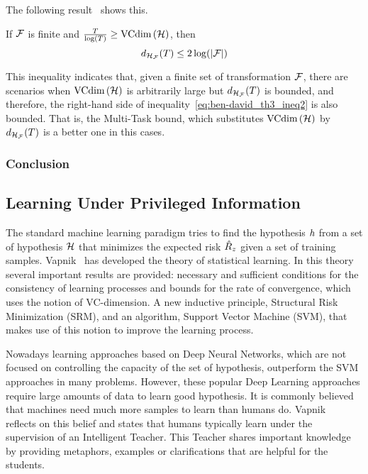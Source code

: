 The following result~\cite[Theorem~6]{Ben-DavidB08} shows this.
\begin{theorem}\label{th:ben-david_th6}
    If $\mathcal{F}$ is finite and $\frac{T}{\log (T)} \geq \text{VCdim}\left(\mathcal{H}\right)$, then
    \begin{equation}
        \nonumber
        d_{\mathcal{H}_{\mathcal{F}}}(T) \leq 2 \log(\left|\mathcal{F}\right|)
    \end{equation}
\end{theorem}
This inequality indicates that, given a finite set of transformation $\mathcal{F}$, there are scenarios when $\text{VCdim}\left(\mathcal{H}\right)$ is arbitrarily large but $d_{\mathcal{H}_{\mathcal{F}}}(T)$ is bounded, and therefore, the right-hand side of inequality~\eqref{eq:ben-david_th3_ineq2} is also bounded. That is, the Multi-Task bound, which substitutes $\text{VCdim}\left(\mathcal{H}\right)$ by $d_{\mathcal{H}_{\mathcal{F}}}(T)$ is a better one in this cases. 

\subsubsection*{Conclusion}



\subsection{Learning Under Privileged Information}
The standard machine learning paradigm tries to find the hypothesis $h$ from a set of hypothesis $\mathcal{H}$ that minimizes the expected risk $\hat{R}_z$ given a set of training samples.
Vapnik~\cite{vapnik2013nature} has developed the theory of statistical learning. In this theory several important results are provided: necessary and sufficient conditions for the consistency of learning processes and bounds for the rate of convergence, which uses the notion of VC-dimension. A new inductive principle, Structural Risk Minimization (SRM), and an algorithm, Support Vector Machine (SVM), that makes use of this notion to improve the learning process.

Nowadays learning approaches based on Deep Neural Networks, which are not focused on controlling the capacity of the set of hypothesis, outperform the SVM approaches in many problems. However, these popular Deep Learning approaches require large amounts of data to learn good hypothesis.
It is commonly believed that machines need much more samples to learn than humans do. Vapnik~\cite{VapnikV09, VapnikI15a} reflects on this belief and states that humans typically learn under the supervision of an Intelligent Teacher.
This Teacher shares important knowledge by providing metaphors, examples or clarifications that are helpful for the students.



